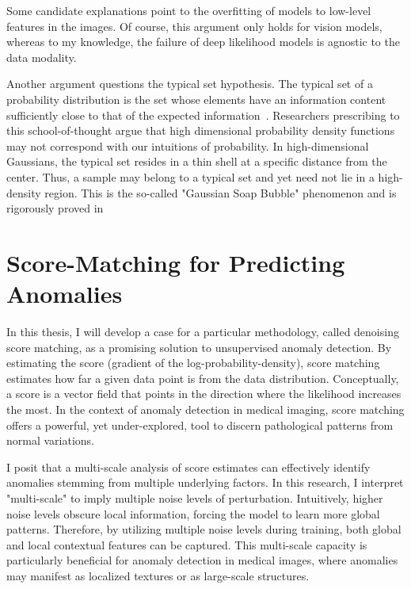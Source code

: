 Some candidate explanations point to the overfitting of models to low-level features in the images. Of course, this argument only holds for vision models, whereas to my knowledge, the failure of deep likelihood models is agnostic to the data modality.

Another argument questions the typical set hypothesis.
The typical set of a probability distribution is the set whose elements have an information content sufficiently close to that of the expected information~\cite{shannon_1948}.
Researchers prescribing to this school-of-thought argue that high dimensional probability density functions may not correspond with our intuitions of probability. In high-dimensional Gaussians, the typical set resides in a thin shell at a specific distance from the center. Thus, a sample may belong to a typical set and yet need not lie in a high-density region. This is the so-called "Gaussian Soap Bubble" phenomenon and is rigorously proved in \cite{vershynin2018high}


\section{Score-Matching for Predicting Anomalies}

In this thesis, I will develop a case for a particular methodology, called denoising score matching, as a promising solution to unsupervised anomaly detection. By estimating the score (gradient of the log-probability-density), score matching estimates how far a given data point is from the data distribution. Conceptually, a score is a vector field that points in the direction where the likelihood increases the most. In the context of anomaly detection in medical imaging, score matching offers a powerful, yet under-explored, tool to discern pathological patterns from normal variations.

I posit that a multi-scale analysis of score estimates can effectively identify anomalies stemming from multiple underlying factors. In this research, I interpret "multi-scale" to imply multiple noise levels of perturbation. Intuitively, higher noise levels obscure local information, forcing the model to learn more global patterns. Therefore, by utilizing multiple noise levels during training, both global and local contextual features can be captured. This multi-scale capacity is particularly beneficial for anomaly detection in medical images, where anomalies may manifest as localized textures or as large-scale structures.


